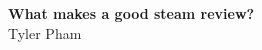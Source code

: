 \documentclass[a4paper,12pt]{article}
\begin{document}
\pagestyle{fancy}
\thispagestyle{empty}
\renewcommand*{\thefootnote}{\fnsymbol{footnote}}
\begin{center}
\Large{\textbf{What makes a good steam review?}}
\vspace{0.1cm}
\normalsize
\\ Tyler Pham \\
\vspace{0.1cm}
\medskip
\normalsize
\end{center}

\vspace{0.1cm}

\end{document}
